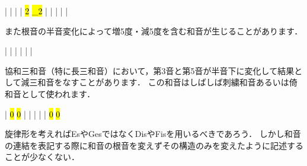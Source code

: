 \documentclass[dvipdfmx,uplatex,b5paper,openany,jbase=12Q,nomag*,textwidth-limit=44%
               ]{gachimuchi}
\begin{document}
\begin{Music}
  \generalmeter{\meterC}%
  \Startpiece
  \NOTes%
  |%
  \en\bar%
  \NOTEs%
  |%
  \en\doublebar%
  \NOTes%
  |%
  \hl{2}%
  \hl{_2}%
  \en\bar%
  \NOTEs%
  |%
  \en\doublebar%
  \NOTes%
  |%
  \en\bar%
  \NOTEs%
  |%
  \en\setdoublebar%
  \endpiece%
\end{Music}

また根音の半音変化によって増5度・減5度を含む和音が生じることがあります．

\begin{Music}
  \generalmeter{\meterC}%
  \Startpiece
  \NOTes%
  |%
  \sk%
  \en\bar%
  \NOTEs%
  |%
  \en\doublebar%
  \NOTes%
  |%
  \sk%
  \en\bar%
  \NOTEs%
  |%
  \en\setdoublebar%
  \endpiece%
\end{Music}

協和三和音（特に長三和音）において，第3音と第5音が半音下に変化して結果として減三和音をなすことがあります．
この和音はしばしば刺繍和音あるいは倚和音として使われます．

\begin{Music}
  \generalmeter{\meterC}%
  \Startpiece
  \NOTes%
  |%
  \hl{0}%
  \hl{0}%
  \en\bar%
  \NOTes%
  \Mryaku\sk|%
  \Mryaku\sk%
  \en\doublebar%
  \NOTes%
  \Mryaku\sk{}|%
  \Mryaku\sk{}%
  \en\bar%
  \NOTes%
  |%
  \hl{0}%
  \hl{0}%
  \en\setdoublebar%
  \endpiece%
\end{Music}

\begin{NB}
旋律形を考えればEsやGesではなくDisやFisを用いるべきであろう．
しかし和音の連結を表記する際に和音の根音を変えずその構造のみを変えたように記述することが少なくない．
\end{NB}
\end{document}

